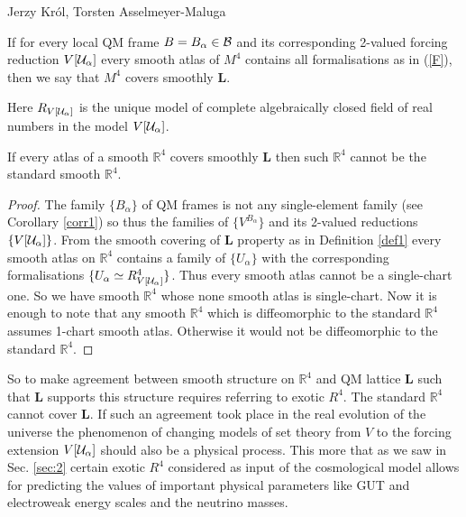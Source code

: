 \begin{artengenv2auth}{Jerzy Kr\'ol, Torsten Asselmeyer-Maluga}
\begin{Definition}
If for every local QM frame $B=B_{\alpha}\in {\cal B}$ and its corresponding 2-valued forcing reduction $V[{\cal U}_{\alpha}]$ every smooth atlas of $M^4$ contains all formalisations as in (\ref{F}), then we say that $M^4$ covers smoothly {\bf L}.  
\end{Definition}
Here $R_{V[{\cal U}_{\alpha}]}$ is the unique model of complete algebraically closed field of real numbers in the model $V[{\cal U}_{\alpha}]$.
\begin{Theorem}
If every atlas of a smooth $\mathbb{R}^4$ covers smoothly {\bf L} then such $\mathbb{R}^4$ cannot be the standard smooth $\mathbb{R}^4$.
\end{Theorem}
\begin{proof}
The family $\{B_{\alpha}\}$ of QM frames is not any single-element family (see Corollary \ref{corr1}) so thus the families of $\{V^{B_{\alpha}}\}$ and its 2-valued reductions $\{V[{\cal U}_{\alpha}]\}$. From the smooth covering of {\bf L} property as in Definition \ref{def1} every smooth atlas on $\mathbb{R}^4$ contains a family of $\{U_{\alpha}\}$ with the corresponding formalisations $\{U_{\alpha}\simeq R^4_{V[{\cal U}_{\alpha}]} \}$. Thus every smooth atlas cannot be a single-chart one. 
So we have smooth $\mathbb{R}^4$ whose none smooth atlas is single-chart. Now it is enough to note that any smooth $\mathbb{R}^4$ which is diffeomorphic to the standard $\mathbb{R}^4$ assumes 1-chart smooth atlas. Otherwise it would not be diffeomorphic to the standard $\mathbb{R}^4$.
\end{proof}
So to make agreement between smooth structure on $\mathbb{R}^4$ and QM lattice {\bf L} such that {\bf L} supports this structure requires referring to exotic $R^4$. The standard $\mathbb{R}^4$ cannot cover {\bf L}. If such an agreement took place in the real evolution of the universe the phenomenon of changing models of set theory from $V$ to the forcing extension $V[{\cal U}_{\alpha}]$ should also be a physical process. This more that as we saw in Sec. \ref{sec:2} certain exotic $R^4$ considered as input of the cosmological model allows for predicting the values of important physical parameters like GUT and electroweak energy scales and the neutrino masses. 


\end{artengenv2auth}
